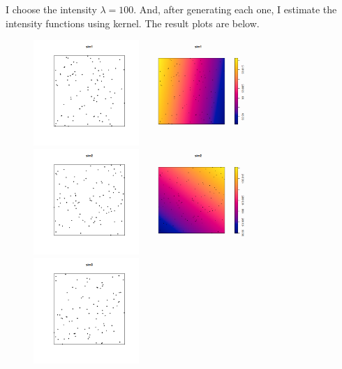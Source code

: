 \documentclass{article}
\begin{document}
I choose the intensity $\lambda=100$.
And, after generating each one, I estimate the intensity functions using kernel.
The result plots are below.

\begin{figure}[!h]
    \centering
    \includegraphics[width=4cm]{prob2_sim1_scatterplot.png}
    \includegraphics[width=4cm]{prob2_sim1_ker.png}
    \includegraphics[width=4cm]{prob2_sim2_scatterplot.png}
    \includegraphics[width=4cm]{prob2_sim2_ker.png} \\
    \includegraphics[width=4cm]{prob2_sim3_scatterplot.png}

\end{figure}
\end{document}
